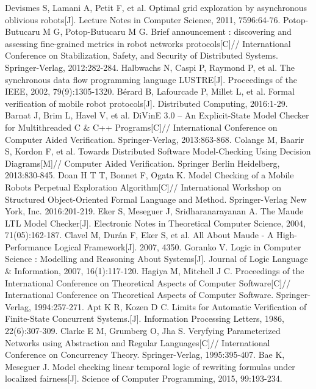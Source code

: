 \begin{thebibliography}{0}
   Devismes S, Lamani A, Petit F, et al. Optimal grid exploration by asynchronous oblivious robots[J]. Lecture Notes in Computer Science, 2011, 7596:64-76.
   Potop-Butucaru M G, Potop-Butucaru M G. Brief announcement : discovering and assessing fine-grained metrics in robot networks protocols[C]// International Conference on Stabilization, Safety, and Security of Distributed Systems. Springer-Verlag, 2012:282-284.
   Halbwachs N, Caspi P, Raymond P, et al. The synchronous data flow programming language LUSTRE[J]. Proceedings of the IEEE, 2002, 79(9):1305-1320.
   Bérard B, Lafourcade P, Millet L, et al. Formal verification of mobile robot protocols[J]. Distributed Computing, 2016:1-29.
   Barnat J, Brim L, Havel V, et al. DiVinE 3.0 – An Explicit-State Model Checker for Multithreaded C & C++ Programs[C]// International Conference on Computer Aided Verification. Springer-Verlag, 2013:863-868.
   Colange M, Baarir S, Kordon F, et al. Towards Distributed Software Model-Checking Using Decision Diagrams[M]// Computer Aided Verification. Springer Berlin Heidelberg, 2013:830-845.
   Doan H T T, Bonnet F, Ogata K. Model Checking of a Mobile Robots Perpetual Exploration Algorithm[C]// International Workshop on Structured Object-Oriented Formal Language and Method. Springer-Verlag New York, Inc. 2016:201-219.
   Eker S, Meseguer J, Sridharanarayanan A. The Maude LTL Model Checker[J]. Electronic Notes in Theoretical Computer Science, 2004, 71(05):162-187.
   Clavel M, Durán F, Eker S, et al. All About Maude - A High-Performance Logical Framework[J]. 2007, 4350.
   Goranko V. Logic in Computer Science : Modelling and Reasoning About Systems[J]. Journal of Logic Language & Information, 2007, 16(1):117-120.
   Hagiya M, Mitchell J C. Proceedings of the International Conference on Theoretical Aspects of Computer Software[C]// International Conference on Theoretical Aspects of Computer Software. Springer-Verlag, 1994:257-271.
   Apt K R, Kozen D C. Limits for Automatic Verification of Finite-State Concurrent Systems.[J]. Information Processing Letters, 1986, 22(6):307-309.
   Clarke E M, Grumberg O, Jha S. Veryfying Parameterized Networks using Abstraction and Regular Languages[C]// International Conference on Concurrency Theory. Springer-Verlag, 1995:395-407.
   Bae K, Meseguer J. Model checking linear temporal logic of rewriting formulas under localized fairness[J]. Science of Computer Programming, 2015, 99:193-234.

\end{thebibliography}
